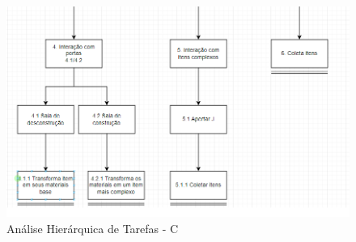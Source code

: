 \begin{figure}[h]
    \centering
    \includegraphics[width=\textwidth]{figuras/aht-c.png}
    \caption{Análise Hierárquica de Tarefas - C}
    \label{fig_analise_hierarquica_c}
\end{figure}

